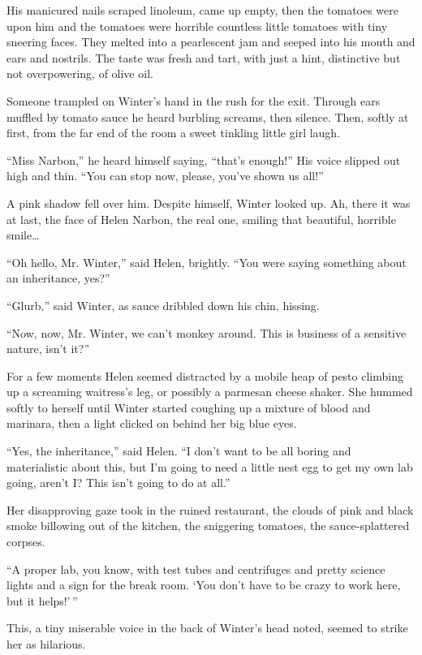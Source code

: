 \documentclass[ebook,10pt]{memoir}
\begin{document}
His manicured nails scraped linoleum, came up empty, then the tomatoes
were upon him and the tomatoes were horrible countless little tomatoes
with tiny sneering faces. They melted into a pearlescent jam and
seeped into his mouth and ears and nostrils. The taste was fresh and
tart, with just a hint, distinctive but not overpowering, of olive
oil.

Someone trampled on Winter's hand in the rush for the exit. Through
ears muffled by tomato sauce he heard burbling screams, then
silence. Then, softly at first, from the far end of the room a sweet
tinkling little girl laugh.

``Miss Narbon,'' he heard himself saying, ``that's enough!'' His voice
slipped out high and thin. ``You can stop now, please, you've shown us
all!''

A pink shadow fell over him. Despite himself, Winter looked up. Ah,
there it was at last, the face of Helen Narbon, the real one, smiling
that beautiful, horrible smile\ldots

``Oh hello, Mr. Winter,'' said Helen, brightly. ``You were saying
something about an inheritance, yes?''

``Glurb,'' said Winter, as sauce dribbled down his chin, hissing.

``Now, now, Mr. Winter, we can't monkey around. This is business of a
sensitive nature, isn't it?''

For a few moments Helen seemed distracted by a mobile heap of pesto
climbing up a screaming waitress's leg, or possibly a parmesan cheese
shaker. She hummed softly to herself until Winter started coughing up
a mixture of blood and marinara, then a light clicked on behind her
big blue eyes.

``Yes, the inheritance,'' said Helen. ``I don't want to be all boring
and materialistic about this, but I'm going to need a little nest egg
to get my own lab going, aren't I? This isn't going to do at all.''

Her disapproving gaze took in the ruined restaurant, the clouds of
pink and black smoke billowing out of the kitchen, the sniggering
tomatoes, the sauce-splattered corpses.

``A proper lab, you know, with test tubes and centrifuges and pretty
science lights and a sign for the break room. `You don't have to be
crazy to work here, but it helps!'\,''

This, a tiny miserable voice in the back of Winter's head noted,
seemed to strike her as hilarious.
\end{document}
